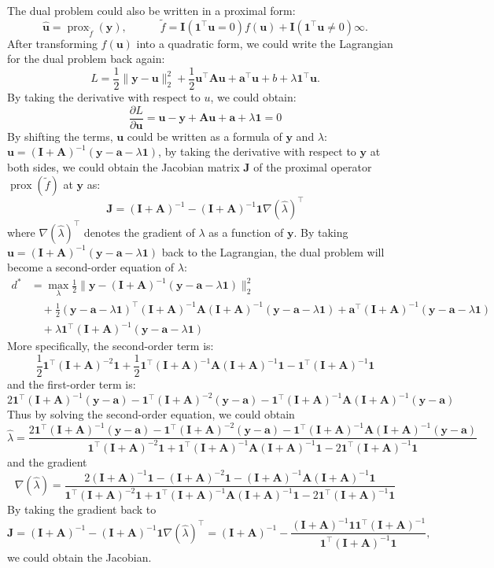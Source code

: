 \documentclass[11pt]{article}
\newcommand{\ba}{\bm{a}}
\newcommand{\bu}{\bm{u}}
\newcommand{\by}{\bm{y}}
\newcommand{\bA}{\bm{A}}
\newcommand{\bI}{\bm{I}}
\newcommand{\bJ}{\bm{J}}
\newcommand{\bOne}{\bm{1}}
\DeclareMathOperator{\prox}{prox}
\begin{document}
The dual problem could also be written in a proximal form: \[\hat{\bu} = \prox_{\tilde{f}}(\by),\qquad\quad\tilde{f} = \bI(\bOne^{\top}\bu=0)f(\bu) + \bI(\bOne^{\top}\bu \neq 0)\infty.\] After transforming $f(\bu)$ into a quadratic form, we could write the Lagrangian for the dual problem back again: \[L = \frac{1}{2}\|\by-\bu\|_{2}^{2} + \frac{1}{2}\bu^{\top}\bA\bu+\ba^{\top}\bu+b + \lambda\bOne^{\top}\bu.\] By taking the derivative with respect to $u$, we could obtain: \[\frac{\partial L}{ \partial \bu} =\bu - \by +\bA\bu+\ba+\lambda\bOne = 0\] By shifting the terms, $\bu$ could be written as a formula of $\by$ and $\lambda$: $\bu = (\bI+\bA)^{-1}(\by-\ba-\lambda\bOne)$, by taking the derivative with respect to $\by$ at both sides, we could obtain the Jacobian matrix $\bJ$ of the proximal operator $\prox(\tilde{f})$ at $\by$ as: \[\bJ = (\bI+\bA)^{-1} -(\bI+\bA)^{-1}\bOne\nabla(\hat{\lambda})^{\top}\]
where $\nabla(\hat{\lambda})^{\top}$ denotes the gradient of $\lambda$ as a function of $\by$.
By taking $\bu = (\bI+\bA)^{-1}(\by-\ba-\lambda\bOne)$ back to the Lagrangian, the dual problem will become a second-order equation of $\lambda$: 
\begin{align*}
d^{*}&= \max\limits_{\lambda} \frac{1}{2}\|\by-(\bI+\bA)^{-1}(\by-\ba-\lambda\bOne)\|_{2}^{2}\\
&\quad+\frac{1}{2}(\by-\ba-\lambda\bOne)^{\top}(\bI+\bA)^{-1}\bA(\bI+\bA)^{-1}(\by-\ba-\lambda\bOne)+\ba^{\top}(\bI+\bA)^{-1}(\by-\ba-\lambda\bOne)\\
&\quad+\lambda\bOne^{\top}(\bI+\bA)^{-1}(\by-\ba-\lambda\bOne)
\end{align*}
More specifically, the second-order term is: \[\frac{1}{2}\bOne^{\top}(\bI+\bA)^{-2}\bOne+\frac{1}{2}\bOne^{\top}(\bI+\bA)^{-1}\bA(\bI+\bA)^{-1}\bOne-\bOne^{\top}(\bI+\bA)^{-1}\bOne\]
and the first-order term is: \[2\bOne^{\top}(\bI+\bA)^{-1}(\by-\ba)-\bOne^{\top}(\bI+\bA)^{-2}(\by-\ba)-\bOne^{\top}(\bI+\bA)^{-1}\bA(\bI+\bA)^{-1}(\by-\ba)\] Thus by solving the second-order equation, we could obtain \[\hat{\lambda} = \frac{2\bOne^{\top}(\bI+\bA)^{-1}(\by-\ba)-\bOne^{\top}(\bI+\bA)^{-2}(\by-\ba)-\bOne^{\top}(\bI+\bA)^{-1}\bA(\bI+\bA)^{-1}(\by-\ba)}{\bOne^{\top}(\bI+\bA)^{-2}\bOne+\bOne^{\top}(\bI+\bA)^{-1}\bA(\bI+\bA)^{-1}\bOne-2\bOne^{\top}(\bI+\bA)^{-1}\bOne}\]
and the gradient \[\nabla(\hat{\lambda}) = \frac{2(\bI+\bA)^{-1}\bOne-(\bI+\bA)^{-2}\bOne-(\bI+\bA)^{-1}\bA(\bI+\bA)^{-1}\bOne}{\bOne^{\top}(\bI+\bA)^{-2}\bOne+\bOne^{\top}(\bI+\bA)^{-1}\bA(\bI+\bA)^{-1}\bOne-2\bOne^{\top}(\bI+\bA)^{-1}\bOne}\]
By taking the gradient back to \[\bJ = (\bI+\bA)^{-1} -(\bI+\bA)^{-1}\bOne\nabla(\hat{\lambda})^{\top} = (\bI+\bA)^{-1} -\frac{(\bI+\bA)^{-1}\bOne\bOne^{\top}(\bI+\bA)^{-1}}{\bOne^{\top}(\bI+\bA)^{-1}\bOne},\] we could obtain the Jacobian.
\end{document}

